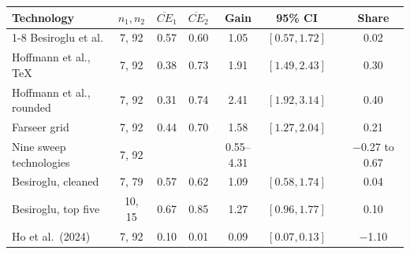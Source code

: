 \begin{table}[tp]
\begin{tabular}{@{}l ccccccc@{}}
Technology & $n_1,n_2$ & $\overline{CE}_1$ & \multicolumn{1}{c}{$\overline{CE}_2$} & \multicolumn{1}{c}{Gain} & 95\% CI & & Share \\
\cmidrule(l){1-8}
Besiroglu et al. & 7, 92 & 0.57 & 0.60 & 1.05 & $[0.57, 1.72]$ &  & 0.02 \\
Hoffmann et al., TeX & 7, 92 & 0.38 & 0.73 & 1.91 & $[1.49, 2.43]$ &  & 0.30 \\
Hoffmann et al., rounded & 7, 92 & 0.31 & 0.74 & 2.41 & $[1.92, 3.14]$ &  & 0.40 \\
Farseer grid & 7, 92 & 0.44 & 0.70 & 1.58 & $[1.27, 2.04]$ &  & 0.21 \\
Nine sweep technologies & 7, 92 &  &  & 0.55--4.31 &  &  & $-$0.27 to 0.67 \\
Besiroglu, cleaned & 7, 79 & 0.57 & 0.62 & 1.09 & $[0.58, 1.74]$ &  & 0.04 \\
Besiroglu, top five & 10, 15 & 0.67 & 0.85 & 1.27 & $[0.96, 1.77]$ &  & 0.10 \\
Ho et al.\ (2024) & 7, 92 & 0.10 & 0.01 & 0.09 & $[0.07, 0.13]$ &  & $-$1.10 \\
\bottomrule
\end{tabular}


\end{table}
